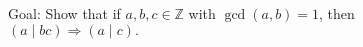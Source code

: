 \documentclass[preview]{standalone}
\begin{document}
\begin{center}
Goal: Show that if $a, b, c \in \mathbb{Z}$ with $\gcd(a, b) = 1$, then \\$(a \mid bc) \Rightarrow (a \mid c).$
\end{center}
\end{document}

